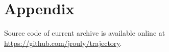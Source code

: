 \documentclass[twocolumn]{article}
\numberwithin{equation}{section} %
\numberwithin{figure}{section} %
\numberwithin{table}{section} %
\begin{document}

\appendix
\section{Appendix}


Source code of current archive is available online at
\href{https://github.com/jrouly/trajectory.git}{https://github.com/jrouly/trajectory}.

\end{document}
